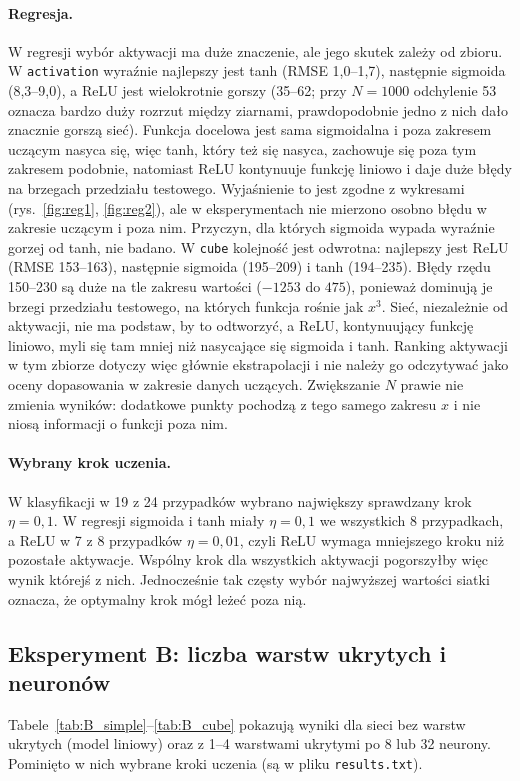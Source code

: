 \documentclass[11pt,a4paper]{article}
\begin{document}
	\paragraph{Regresja.} W regresji wybór aktywacji ma duże znaczenie, ale jego skutek zależy od zbioru. W \texttt{activation} wyraźnie najlepszy jest tanh (RMSE 1,0--1,7), następnie sigmoida (8,3--9,0), a ReLU jest wielokrotnie gorszy (35--62; przy $N=1000$ odchylenie 53 oznacza bardzo duży rozrzut między ziarnami, prawdopodobnie jedno z nich dało znacznie gorszą sieć). Funkcja docelowa jest sama sigmoidalna i poza zakresem uczącym nasyca się, więc tanh, który też się nasyca, zachowuje się poza tym zakresem podobnie, natomiast ReLU kontynuuje funkcję liniowo i daje duże błędy na brzegach przedziału testowego. Wyjaśnienie to jest zgodne z wykresami (rys.~\ref{fig:reg1}, \ref{fig:reg2}), ale w eksperymentach nie mierzono osobno błędu w zakresie uczącym i poza nim. Przyczyn, dla których sigmoida wypada wyraźnie gorzej od tanh, nie badano.
	W \texttt{cube} kolejność jest odwrotna: najlepszy jest ReLU (RMSE 153--163), następnie sigmoida (195--209) i tanh (194--235). Błędy rzędu 150--230 są duże na tle zakresu wartości ($-1253$ do $475$), ponieważ dominują je brzegi przedziału testowego, na których funkcja rośnie jak $x^3$. Sieć, niezależnie od aktywacji, nie ma podstaw, by to odtworzyć, a ReLU, kontynuujący funkcję liniowo, myli się tam mniej niż nasycające się sigmoida i tanh. Ranking aktywacji w tym zbiorze dotyczy więc głównie ekstrapolacji i nie należy go odczytywać jako oceny dopasowania w zakresie danych uczących. Zwiększanie $N$ prawie nie zmienia wyników: dodatkowe punkty pochodzą z tego samego zakresu $x$ i nie niosą informacji o funkcji poza nim.
	
	\paragraph{Wybrany krok uczenia.} W klasyfikacji w 19 z 24 przypadków wybrano największy sprawdzany krok $\eta=0{,}1$. W regresji sigmoida i tanh miały $\eta=0{,}1$ we wszystkich 8 przypadkach, a ReLU w 7 z 8 przypadków $\eta=0{,}01$, czyli ReLU wymaga mniejszego kroku niż pozostałe aktywacje. Wspólny krok dla wszystkich aktywacji pogorszyłby więc wynik którejś z nich. Jednocześnie tak częsty wybór najwyższej wartości siatki oznacza, że optymalny krok mógł leżeć poza nią.
	
	\subsection{Eksperyment B: liczba warstw ukrytych i neuronów}
	Tabele~\ref{tab:B_simple}--\ref{tab:B_cube} pokazują wyniki dla sieci bez warstw ukrytych (model liniowy) oraz z 1--4 warstwami ukrytymi po 8 lub 32 neurony. Pominięto w nich wybrane kroki uczenia (są w pliku \texttt{results.txt}).
	
\end{document}
